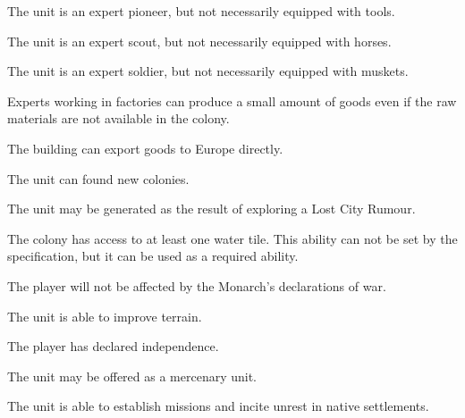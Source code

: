 \documentclass[12pt]{book}
\begin{document}
The unit is an expert pioneer, but not necessarily equipped with tools.

\affectsUnit

The unit is an expert scout, but not necessarily equipped with horses.

\affectsUnit

The unit is an expert soldier, but not necessarily equipped with muskets.

\affectsPlayer

Experts working in factories can produce a small amount of goods even
if the raw materials are not available in the colony.

\affectsBuilding

The building can export goods to Europe directly.

\affectsUnit

The unit can found new colonies.

\affectsUnit

The unit may be generated as the result of exploring a Lost City Rumour.

\affectsColony

The colony has access to at least one water tile. This ability can not
be set by the specification, but it can be used as a required ability.

\affectsPlayer

The player will not be affected by the Monarch's declarations of war.

\affectsUnit

The unit is able to improve terrain.

\affectsPlayer

The player has declared independence.

\affectsUnit

The unit may be offered as a mercenary unit.

\affectsUnit

The unit is able to establish missions and incite unrest in native
settlements.

\affectsTile
\end{document}
